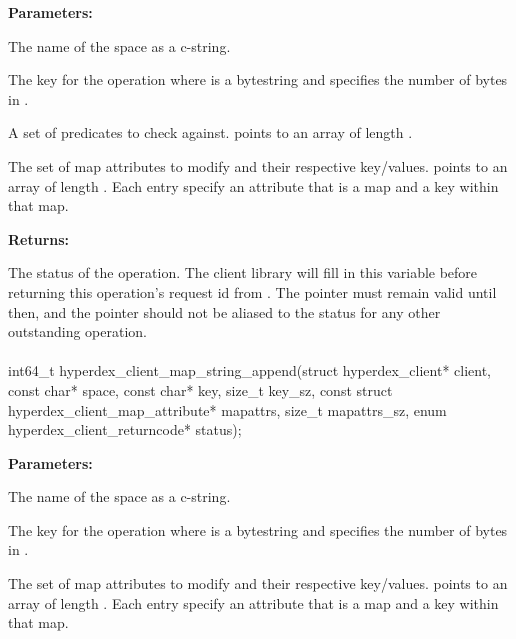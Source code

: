 \noindent\textbf{Parameters:}
\begin{description}[labelindent=\widthof{{\code{mapattrs}, \code{mapattrs\_sz}}},leftmargin=*,noitemsep,nolistsep,align=right]
\item[\code{space}] The name of the space as a c-string.
\item[\code{key}, \code{key\_sz}] The key for the operation where  is a bytestring and  specifies the number of bytes in .
\item[\code{checks}, \code{checks\_sz}] A set of predicates to check against.   points to an array of length .
\item[\code{mapattrs}, \code{mapattrs\_sz}] The set of map attributes to modify and their respective key/values.   points to an array of length .  Each entry specify an attribute that is a map and a key within that map.
\end{description}

\noindent\textbf{Returns:}
\begin{description}[labelindent=\widthof{{\code{status}}},leftmargin=*,noitemsep,nolistsep,align=right]
\item[\code{status}] The status of the operation.  The client library will fill in this variable before returning this operation's request id from .  The pointer must remain valid until then, and the pointer should not be aliased to the status for any other outstanding operation.
\end{description}

\paragraph{}
\label{api:c:map_string_append}
\begin{ccode}
int64_t hyperdex_client_map_string_append(struct hyperdex_client* client,
        const char* space,
        const char* key, size_t key_sz,
        const struct hyperdex_client_map_attribute* mapattrs, size_t mapattrs_sz,
        enum hyperdex_client_returncode* status);
\end{ccode}
\funcdesc 

\noindent\textbf{Parameters:}
\begin{description}[labelindent=\widthof{{\code{mapattrs}, \code{mapattrs\_sz}}},leftmargin=*,noitemsep,nolistsep,align=right]
\item[\code{space}] The name of the space as a c-string.
\item[\code{key}, \code{key\_sz}] The key for the operation where  is a bytestring and  specifies the number of bytes in .
\item[\code{mapattrs}, \code{mapattrs\_sz}] The set of map attributes to modify and their respective key/values.   points to an array of length .  Each entry specify an attribute that is a map and a key within that map.
\end{description}

